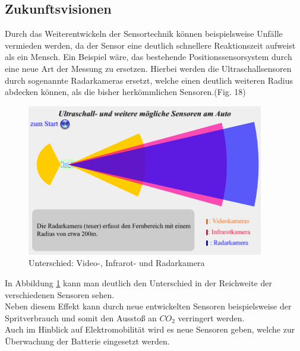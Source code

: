	             
	             \subsection{Zukunftsvisionen} 
	                  Durch das Weiterentwickeln der Sensortechnik können beispielsweise Unfälle vermieden werden, da der Sensor eine deutlich schnellere Reaktionszeit aufweist als ein Mensch.
	                  Ein Beispiel wäre, das bestehende Positionssensorsystem durch eine neue Art der Messung zu ersetzen. Hierbei werden die Ultraschallsensoren 
	                  durch sogenannte Radarkameras ersetzt, welche einen deutlich weiteren Radius abdecken können, als die bisher herkömmlichen Sensoren.(Fig. 18)
	                  
	                  \begin{figure}
	                      \includegraphics[width=\textwidth] {radarsensor.png}
	                      \caption[www.leifiphysik.de/akustik/schallgeschwindigkeit/ausblick/ultraschall-beim-auto]{Unterschied: Video-, Infrarot- und Radarkamera}
	                      \label{fig:TS12}
	                  \end{figure}
	     
	                     In Abbildung \ref{fig:TS12} kann man deutlich den Unterschied in der Reichweite der verschiedenen Sensoren sehen.\\
	                     
	                     Neben diesem Effekt kann durch neue entwickelten Sensoren beispielsweise der Spritverbrauch und somit den Ausstoß an $CO_2$ verringert werden.\\
	                     Auch im Hinblick auf Elektromobilität wird es neue Sensoren geben, welche zur Überwachung der Batterie eingesetzt werden.
